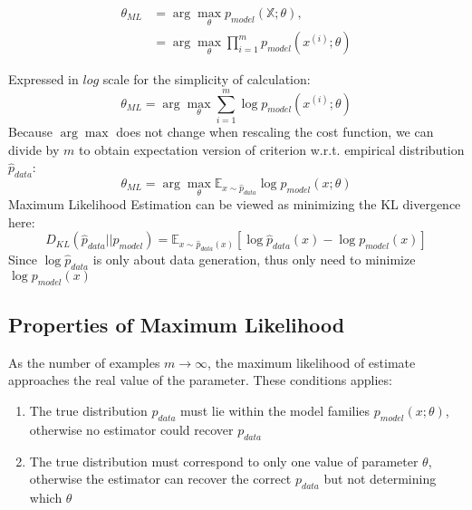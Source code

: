 \documentclass{article}
\newcommand{\argmax}{\arg\!\max}
\begin{document}
\begin{align*}
\theta_{ML} &= \argmax_\theta p_{model}(\mathbb{X};\theta),\\
&= \argmax_\theta \prod_{i=1}^{m}p_{model}(x^{(i)};\theta)
\end{align*}

Expressed in $log$ scale for the simplicity of calculation:
\[ \theta_{ML} = \argmax_\theta \sum_{i=1}^{m}\log p_{model}(x^{(i)};\theta)\]
Because $\argmax$ does not change when rescaling the cost function, we can divide by $m$ to obtain expectation version of criterion w.r.t. empirical distribution $\hat{p}_{data}$:
\[
    \theta_{ML} = \argmax_\theta \mathbb{E}_{x\sim\hat{p}_{data}} \log p_{model}(x;\theta)    
\]
Maximum Likelihood Estimation can be viewed as minimizing the KL divergence here:
\[
    \textit{D}_{KL}(\hat{p}_{data}||p_{model}) = \mathbb{E}_{x\sim\hat{p}_{data}(x)}[\log\hat{p}_{data}(x) - \log p_{model}(x)]    
\]
Since $\log\hat{p}_{data}$ is only about data generation, thus only need to minimize $\log p_{model}(x)$
\subsection*{Properties of Maximum Likelihood}
As the number of examples $m \rightarrow \infty$, the maximum likelihood of estimate approaches the real value of the parameter. These conditions applies:
\begin{enumerate}
    \item The true distribution $p_{data}$ must lie within the model families $p_{model}(x;\theta)$, otherwise no estimator could recover $p_{data}$
    \item The true distribution must correspond to only one value of parameter $\theta$, otherwise the estimator can recover the correct $p_{data}$ but not determining which $\theta$
\end{enumerate}
\end{document}
